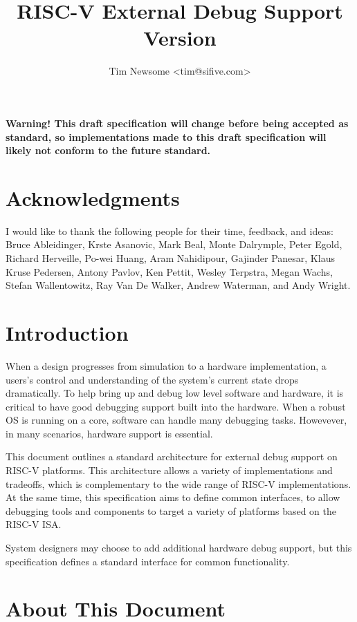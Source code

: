 \documentclass{article}
\title{RISC-V External Debug Support\\
Version \versionnum\\
\GITHash
}
\author{Tim Newsome \textless tim@sifive.com\textgreater}
\date{\GITAuthorDate}
\begin{document}
\maketitle

{\bf Warning! This draft specification will change before being accepted as
standard, so implementations made to this draft specification will likely not
conform to the future standard.}

\tableofcontents
\listoffigures
\listoftables

\newpage

\section*{Acknowledgments}

I would like to thank the following people for their time, feedback, and ideas:
Bruce Ableidinger,
Krste Asanovic,
Mark Beal,
Monte Dalrymple,
Peter Egold,
Richard Herveille,
Po-wei Huang,
Aram Nahidipour,
Gajinder Panesar,
Klaus Kruse Pedersen,
Antony Pavlov,
Ken Pettit,
Wesley Terpstra,
Megan Wachs,
Stefan Wallentowitz,
Ray Van De Walker,
Andrew Waterman,
and Andy Wright.

\section{Introduction}

When a design progresses from simulation to a hardware implementation, a users's
control and understanding of the system's current state drops dramatically.
To help bring up and debug low level software and hardware,
it is critical to have good debugging support built into the hardware.
When a robust OS is running on a core, software can handle many
debugging tasks. Howevever, in many scenarios, hardware support is essential.

This document outlines a standard architecture for external debug support 
on RISC-V platforms. This architecture allows a variety of implementations and
tradeoffs, which is complementary to the wide range of RISC-V implementations.
At the same time, this specification aims to define common interfaces, to
allow debugging tools and components to target a variety of platforms based on the RISC-V ISA.

System designers may choose to add additional hardware debug support,
but this specification defines a standard interface for common
functionality.

\section{About This Document}
\end{document}
